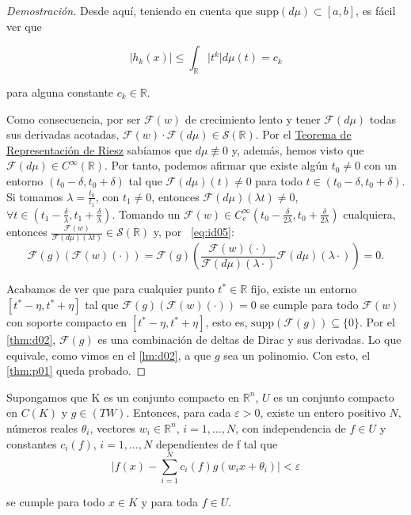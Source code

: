 \begin{proof}[Demostración]
Desde aquí, teniendo en cuenta que $\mathrm{supp}(d\mu)\subset [a,b] $, es fácil ver que 

$$ \vert h_{k}(x)\vert \leq \int_{\mathds{R}} \vert t^{k} \vert d\mu (t)= c_{k}$$

para alguna constante $c_{k}\in \mathds{R}$.  


Como consecuencia, por ser $\mathcal{F}(w)$ de crecimiento lento y tener $\mathcal{F}(d\mu)$ todas sus derivadas acotadas,  \(\mathcal{F}(w)\cdot \mathcal{F}(d\mu)\in \mathcal{S}(\mathds{R})\). 
Por el \hyperref[thm:h04]{Teorema de Representación de Riesz} sabíamos que \(d\mu \not\equiv 0 \) y, además, hemos visto que \(\mathcal{F}(d\mu)\in C^{\infty}(\mathds{R})\). Por tanto, podemos afirmar que existe algún \(t_{0} \neq 0 \) con un entorno \((t_{0}-\delta,t_{0}+\delta)\) tal que \(\mathcal{F}(d\mu)(t) \neq 0\) para todo \(t\in (t_{0}-\delta,t_{0}+\delta)\). Si tomamos \(\lambda = \frac{t_{0}}{t_{1}}\), con \(t_{1} \neq 0\), entonces $\mathcal{F}(d\mu)(\lambda t) \neq 0
$, $ \forall t \in (t_{1}-\frac{\delta}{\lambda},t_{1}+\frac{\delta }{\lambda})$. Tomando un \(\mathcal{F}(w)\in C^{\infty}_{c}(t_{0}-\frac{\delta } {2\lambda},t_{0}+\frac{\delta } {2\lambda})\) cualquiera, entonces \(\frac{\mathcal{F}(w)}{\mathcal{F}(d\mu)(\lambda t)} \in\mathcal{S}(\mathds{R})\) y, por ~\eqref{eq:id05}:
\[\mathcal{F}(g)(\mathcal{F}(w)(\cdot)) = \mathcal{F}(g)\left(\frac{\mathcal{F}(w)(\cdot)} { \mathcal{F}(d\mu)(\lambda\cdot)}\mathcal{F}(d\mu)(\lambda\cdot)\right) = 0.\]

Acabamos de ver que para cualquier punto \(t^{*}\in\mathds{R}\) fijo, existe un entorno \([t^{*}-\eta,t^{*}+\eta]\) tal que \(\mathcal{F}(g)(\mathcal{F}(w)(\cdot))=0\) se cumple para todo \(\mathcal{F}(w)\) con soporte compacto en \([t^{*}-\eta,t^{*}+\eta]\), esto es, \(\mathrm{supp}(\mathcal{F}(g) )\subseteq \{0\}\). Por el \autoref{thm:d02}, \(\mathcal{F}(g)\) es una combinación de deltas de Dirac y sus derivadas. Lo que equivale, como vimos en el \autoref{lm:d02}, a que $g$ sea un polinomio. Con esto, el \autoref{thm:p01} queda probado. 
\end{proof}



\begin{teorema}\label{thm:p03}
Supongamos que K es un conjunto compacto en $\mathds{R}^{n}$,  $U$ es un conjunto compacto en \(C(K)\) y  \(g\in(TW)\). Entonces, para cada $\varepsilon >0$, existe un entero positivo \(N\), números reales $\theta_{i}$, vectores $w_{i}\in\mathds{R}^{n}$, $i=1,\ldots,N$, con independencia de  \(f\in U\) y constantes $c_{i}(f)$,  $i=1,\ldots,N$ dependientes de f tal que 
\[\vert f(x) - \sum_{i=1}^{N}c_{i}(f)g( w_{i} x + \theta_{i}) \vert < \varepsilon\]

se cumple para todo \(x\in K\) y para toda \(f\in U\). 
\end{teorema}


